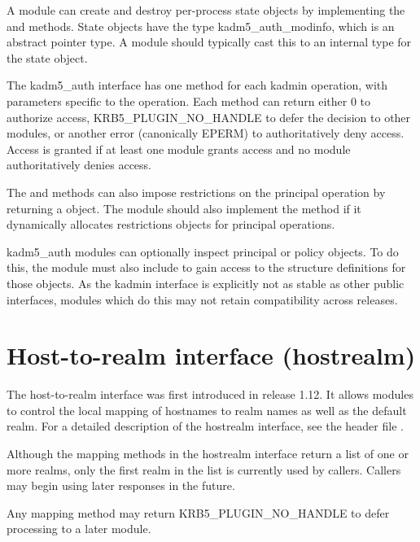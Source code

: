 \documentclass[letterpaper,10pt,english]{sphinxmanual}
\begin{document}
A module can create and destroy per-process state objects by
implementing the  and  methods.  State objects have
the type kadm5\_auth\_modinfo, which is an abstract pointer type.  A
module should typically cast this to an internal type for the state
object.

The kadm5\_auth interface has one method for each kadmin operation,
with parameters specific to the operation.  Each method can return
either 0 to authorize access, KRB5\_PLUGIN\_NO\_HANDLE to defer the
decision to other modules, or another error (canonically EPERM) to
authoritatively deny access.  Access is granted if at least one module
grants access and no module authoritatively denies access.

The  and  methods can also impose restrictions
on the principal operation by returning a  object.  The module should also implement
the  method if it dynamically allocates
restrictions objects for principal operations.

kadm5\_auth modules can optionally inspect principal or policy objects.
To do this, the module must also include  to gain
access to the structure definitions for those objects.  As the kadmin
interface is explicitly not as stable as other public interfaces,
modules which do this may not retain compatibility across releases.


\section{Host-to-realm interface (hostrealm)}
\label{\detokenize{plugindev/hostrealm:hostrealm-plugin}}\label{\detokenize{plugindev/hostrealm::doc}}\label{\detokenize{plugindev/hostrealm:host-to-realm-interface-hostrealm}}
The host-to-realm interface was first introduced in release 1.12.  It
allows modules to control the local mapping of hostnames to realm
names as well as the default realm.  For a detailed description of the
hostrealm interface, see the header file
.

Although the mapping methods in the hostrealm interface return a list
of one or more realms, only the first realm in the list is currently
used by callers.  Callers may begin using later responses in the
future.

Any mapping method may return KRB5\_PLUGIN\_NO\_HANDLE to defer
processing to a later module.
\end{document}
